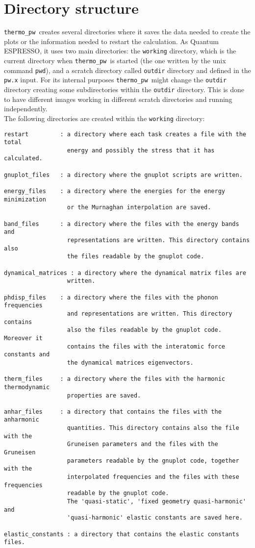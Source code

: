 \documentclass[12pt,a4paper]{article}
\def\qe{{\sc Quantum ESPRESSO}}
\def\thermo{{\texttt{thermo\_pw}}}
\begin{document}
\section{\color{coral}Directory structure}
\thermo\ creates several directories where it saves the data needed to
create the plots or the information needed to restart the calculation.  
As \qe, it uses two main directories: the \texttt{working} 
directory, which is the current directory when \thermo\ is started 
(the one written by the unix command \texttt{pwd}), and a scratch directory 
called \texttt{outdir} directory and defined in the \texttt{pw.x} input. For its
internal purposes \thermo\ might change the \texttt{outdir} directory creating
some subdirectories within the \texttt{outdir} directory. This is done to
have different images working in different scratch directories and running
independently. \\
The following directories are created within the \texttt{working} directory:
\begin{verbatim}
restart         : a directory where each task creates a file with the total
                  energy and possibly the stress that it has calculated.

gnuplot_files   : a directory where the gnuplot scripts are written.

energy_files    : a directory where the energies for the energy minimization
                  or the Murnaghan interpolation are saved.

band_files      : a directory where the files with the energy bands and 
                  representations are written. This directory contains also
                  the files readable by the gnuplot code.

dynamical_matrices : a directory where the dynamical matrix files are
                  written.

phdisp_files    : a directory where the files with the phonon frequencies
                  and representations are written. This directory contains
                  also the files readable by the gnuplot code. Moreover it
                  contains the files with the interatomic force constants and
                  the dynamical matrices eigenvectors.

therm_files     : a directory where the files with the harmonic thermodynamic
                  properties are saved.

anhar_files     : a directory that contains the files with the anharmonic
                  quantities. This directory contains also the file with the
                  Gruneisen parameters and the files with the Gruneisen
                  parameters readable by the gnuplot code, together with the 
                  interpolated frequencies and the files with these frequencies
                  readable by the gnuplot code.
                  The 'quasi-static', 'fixed geometry quasi-harmonic' and
                  'quasi-harmonic' elastic constants are saved here.

elastic_constants : a directory that contains the elastic constants files.
\end{verbatim}
\end{document}

